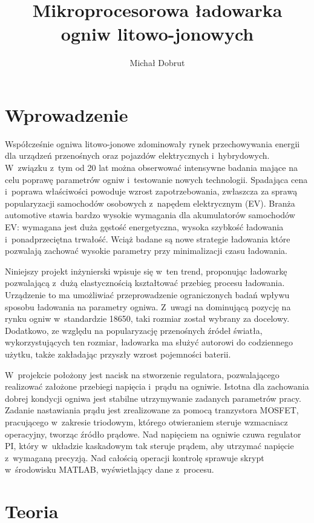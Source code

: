 \documentclass[polish,engineer]{polsl-msth}
\author{Michał Dobrut}
\title{Mikroprocesorowa ładowarka ogniw litowo-jonowych}
\begin{document}
\frontmatter
\maketitle
\makestatement
\tableofcontents
\listoftables
\listoffigures
\mainmatter


\chapter{Wprowadzenie}

Współcześnie ogniwa litowo-jonowe zdominowały rynek przechowywania energii dla urządzeń przenośnych oraz pojazdów elektrycznych i~hybrydowych. W~związku z~tym od 20 lat można obserwować intensywne badania mające na celu poprawę parametrów ogniw i~testowanie nowych technologii. Spadająca cena i~poprawa właściwości powoduje wzrost zapotrzebowania, zwłaszcza za sprawą popularyzacji samochodów osobowych z~napędem elektrycznym (EV). Branża automotive stawia bardzo wysokie wymagania dla akumulatorów samochodów EV: wymagana jest duża gęstość energetyczna, wysoka szybkość ładowania i~ponadprzeciętna trwałość. Wciąż badane są nowe strategie ładowania które pozwalają zachować wysokie parametry przy minimalizacji czasu ładowania.

Niniejszy projekt inżynierski wpisuje się w~ten trend, proponując ładowarkę pozwalającą z~dużą elastycznością kształtować przebieg procesu ładowania. Urządzenie to ma umożliwiać przeprowadzenie ograniczonych badań wpływu sposobu ładowania na parametry ogniwa. Z~uwagi na dominującą pozycję na rynku ogniw w~standardzie 18650, taki rozmiar został wybrany za docelowy. Dodatkowo, ze względu na popularyzację przenośnych źródeł światła, wykorzystujących ten rozmiar, ładowarka ma służyć autorowi do codziennego użytku, także zakładając przyszły wzrost pojemności baterii.

W~projekcie położony jest nacisk na stworzenie regulatora, pozwalającego realizować założone przebiegi napięcia i~prądu na ogniwie. Istotna dla zachowania dobrej kondycji ogniwa jest stabilne utrzymywanie zadanych parametrów pracy. Zadanie nastawiania prądu jest zrealizowane za pomocą tranzystora MOSFET, pracującego w~zakresie triodowym, którego otwieraniem steruje wzmacniacz operacyjny, tworząc źródło prądowe. Nad napięciem na ogniwie czuwa regulator PI, który w~układzie kaskadowym tak steruje prądem, aby utrzymać napięcie z~wymaganą precyzją. Nad całością operacji kontrolę sprawuje skrypt w~środowisku MATLAB, wyświetlający dane z~procesu.


\chapter{Teoria}
\end{document}
